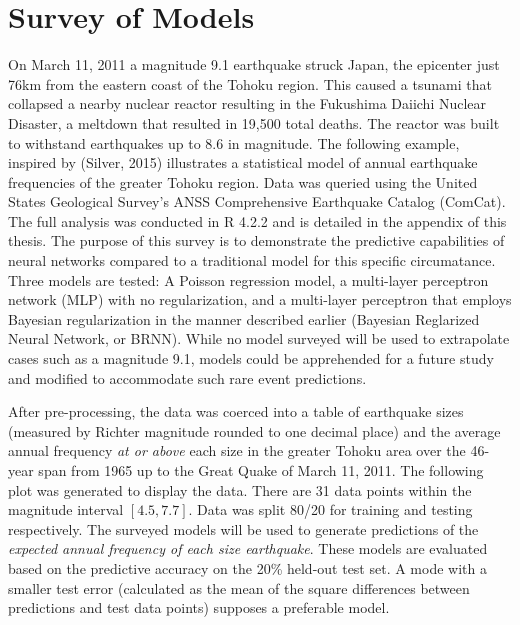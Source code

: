\chapter{Survey of Models}

On March 11, 2011 a magnitude 9.1 earthquake struck Japan, the epicenter just 76km from the eastern coast of the Tohoku region.  This caused a tsunami that collapsed a nearby nuclear reactor resulting in the Fukushima Daiichi Nuclear Disaster, a meltdown that resulted in 19,500 total deaths.  The reactor was built to withstand earthquakes up to 8.6 in magnitude.  The following example, inspired by (Silver, 2015)\cite{silver2015signal} illustrates a statistical model of annual earthquake frequencies of the greater Tohoku region.  Data was queried using the United States Geological Survey's ANSS Comprehensive Earthquake Catalog (ComCat).  The full analysis was conducted in R 4.2.2 and is detailed in the appendix of this thesis.  The purpose of this survey is to demonstrate the predictive capabilities of neural networks compared to a traditional model for this specific circumatance.  Three models are tested:
A Poisson regression model, a multi-layer perceptron network (MLP) with no regularization, and a multi-layer perceptron that employs Bayesian regularization in the manner described earlier (Bayesian Reglarized Neural Network, or BRNN). While no model surveyed will be used to extrapolate cases such as a magnitude 9.1, models could be apprehended for a future study and modified to accommodate such rare event predictions.

After pre-processing, the data was coerced into a table of earthquake sizes (measured by Richter magnitude rounded to one decimal place) and the average annual frequency \textit{at or above} each size in the greater Tohoku area over the 46-year span from 1965 up to the Great Quake of March 11, 2011. 
The following plot was generated to display the data. There are 31 data points within the magnitude interval $[4.5,7.7]$.  Data was split 80/20 for training and testing respectively.  The surveyed models will be used to generate predictions of the \textit{expected annual frequency of each size earthquake}.  These models are evaluated based on the predictive accuracy on the 20\% held-out test set.  A mode with a smaller test error (calculated as the mean of the square differences between predictions and test data points) supposes a preferable model.

